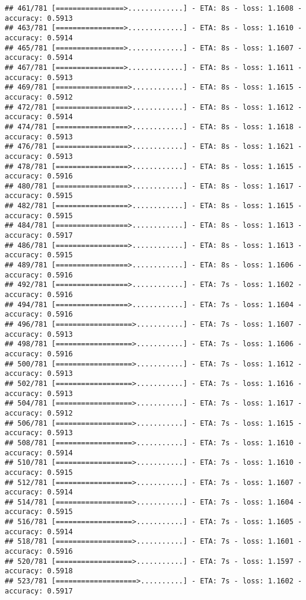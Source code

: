 \documentclass[
]{article}
\begin{document}
\begin{verbatim}
## 461/781 [================>.............] - ETA: 8s - loss: 1.1608 - accuracy: 0.5913
## 463/781 [================>.............] - ETA: 8s - loss: 1.1610 - accuracy: 0.5914
## 465/781 [================>.............] - ETA: 8s - loss: 1.1607 - accuracy: 0.5914
## 467/781 [================>.............] - ETA: 8s - loss: 1.1611 - accuracy: 0.5913
## 469/781 [=================>............] - ETA: 8s - loss: 1.1615 - accuracy: 0.5912
## 472/781 [=================>............] - ETA: 8s - loss: 1.1612 - accuracy: 0.5914
## 474/781 [=================>............] - ETA: 8s - loss: 1.1618 - accuracy: 0.5913
## 476/781 [=================>............] - ETA: 8s - loss: 1.1621 - accuracy: 0.5913
## 478/781 [=================>............] - ETA: 8s - loss: 1.1615 - accuracy: 0.5916
## 480/781 [=================>............] - ETA: 8s - loss: 1.1617 - accuracy: 0.5915
## 482/781 [=================>............] - ETA: 8s - loss: 1.1615 - accuracy: 0.5915
## 484/781 [=================>............] - ETA: 8s - loss: 1.1613 - accuracy: 0.5917
## 486/781 [=================>............] - ETA: 8s - loss: 1.1613 - accuracy: 0.5915
## 489/781 [=================>............] - ETA: 8s - loss: 1.1606 - accuracy: 0.5916
## 492/781 [=================>............] - ETA: 7s - loss: 1.1602 - accuracy: 0.5916
## 494/781 [=================>............] - ETA: 7s - loss: 1.1604 - accuracy: 0.5916
## 496/781 [==================>...........] - ETA: 7s - loss: 1.1607 - accuracy: 0.5913
## 498/781 [==================>...........] - ETA: 7s - loss: 1.1606 - accuracy: 0.5916
## 500/781 [==================>...........] - ETA: 7s - loss: 1.1612 - accuracy: 0.5913
## 502/781 [==================>...........] - ETA: 7s - loss: 1.1616 - accuracy: 0.5913
## 504/781 [==================>...........] - ETA: 7s - loss: 1.1617 - accuracy: 0.5912
## 506/781 [==================>...........] - ETA: 7s - loss: 1.1615 - accuracy: 0.5913
## 508/781 [==================>...........] - ETA: 7s - loss: 1.1610 - accuracy: 0.5914
## 510/781 [==================>...........] - ETA: 7s - loss: 1.1610 - accuracy: 0.5915
## 512/781 [==================>...........] - ETA: 7s - loss: 1.1607 - accuracy: 0.5914
## 514/781 [==================>...........] - ETA: 7s - loss: 1.1604 - accuracy: 0.5915
## 516/781 [==================>...........] - ETA: 7s - loss: 1.1605 - accuracy: 0.5914
## 518/781 [==================>...........] - ETA: 7s - loss: 1.1601 - accuracy: 0.5916
## 520/781 [==================>...........] - ETA: 7s - loss: 1.1597 - accuracy: 0.5918
## 523/781 [===================>..........] - ETA: 7s - loss: 1.1602 - accuracy: 0.5917

\end{verbatim}
\end{document}
